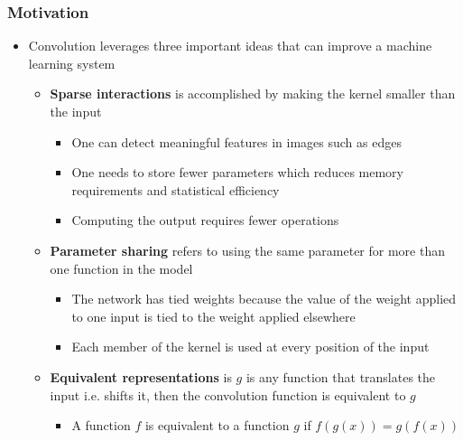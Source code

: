 \documentclass[a4, english]{article}
\begin{document}
\subsubsection{Motivation}  
\begin{itemize}
	\item Convolution leverages three important ideas that can improve a machine learning system 
  \begin{itemize}
  	\item \textbf{Sparse interactions} is accomplished by making the kernel smaller than the input
    \begin{itemize}
    	\item One can detect meaningful features in images such as edges
      \item One needs to store fewer parameters which reduces memory requirements and statistical efficiency
       \item Computing the output requires fewer operations  
    \end{itemize}
    \item \textbf{Parameter sharing} refers to using the same parameter for more than one function in the model
    \begin{itemize}
    	\item The network has tied weights because the value of the weight applied to one input is tied to the weight applied elsewhere
      \item Each member of the kernel is used at every position of the input
    \end{itemize}
    \item \textbf{Equivalent representations} is $g$ is any function that translates the input i.e. shifts it, then the convolution function is equivalent to $g$  
    \begin{itemize}
		  \item A function $f$ is equivalent to a function $g$ if $f(g(x))=g(f(x))$
    \end{itemize}
  \end{itemize}
\end{itemize}
\end{document}
